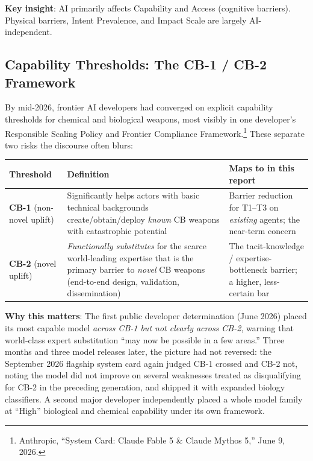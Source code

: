 \documentclass[11pt,letterpaper]{article}
\begin{document}
\textbf{Key insight}: AI primarily affects Capability and Access (cognitive barriers). Physical barriers, Intent Prevalence, and Impact Scale are largely AI-independent.

\subsection{Capability Thresholds: The CB-1 / CB-2 Framework}

By mid-2026, frontier AI developers had converged on explicit capability thresholds for chemical and biological weapons, most visibly in one developer's Responsible Scaling Policy and Frontier Compliance Framework.\footnote{Anthropic, ``System Card: Claude Fable 5 \& Claude Mythos 5,'' June 9, 2026.} These separate two risks the discourse often blurs:

\begin{center}
\small
\begin{tabular}{L{2.5cm}L{5.5cm}L{4cm}}
\toprule
\textbf{Threshold} & \textbf{Definition} & \textbf{Maps to in this report} \\
\midrule
\textbf{CB-1} (non-novel uplift) & Significantly helps actors with basic technical backgrounds create/obtain/deploy \textit{known} CB weapons with catastrophic potential & Barrier reduction for T1--T3 on \textit{existing} agents; the near-term concern \\
\textbf{CB-2} (novel uplift) & \textit{Functionally substitutes} for the scarce world-leading expertise that is the primary barrier to \textit{novel} CB weapons (end-to-end design, validation, dissemination) & The tacit-knowledge / expertise-bottleneck barrier; a higher, less-certain bar \\
\bottomrule
\end{tabular}
\end{center}

\textbf{Why this matters}: The first public developer determination (June 2026) placed its most capable model \textit{across CB-1 but not clearly across CB-2}, warning that world-class expert substitution ``may now be possible in a few areas.'' Three months and three model releases later, the picture had not reversed: the September 2026 flagship system card again judged CB-1 crossed and CB-2 not, noting the model did not improve on several weaknesses treated as disqualifying for CB-2 in the preceding generation, and shipped it with expanded biology classifiers. A second major developer independently placed a whole model family at ``High'' biological and chemical capability under its own framework.
\end{document}
